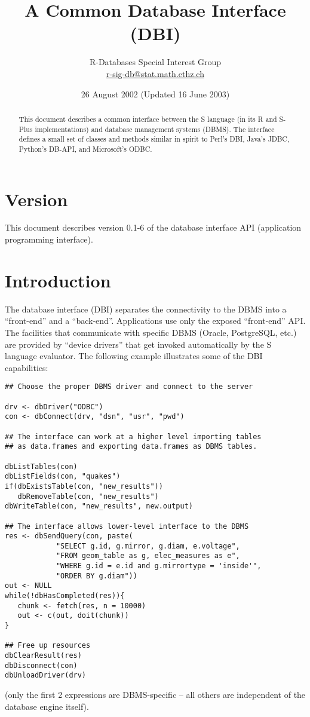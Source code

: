 \documentclass[graphics,times,psfig,dvips,hyper]{article}
\begin{document}
\title{A Common Database Interface (DBI)}
\author{
R-Databases Special Interest Group\\
\href{mailto:r-sig-db@stat.math.ethz.ch}{r-sig-db@stat.math.ethz.ch}
}

\date{26 August 2002 (Updated 16 June 2003)}

\maketitle 
\tableofcontents

\begin{abstract}
This document describes a common interface between the S language 
(in its R and S-Plus implementations) and database management systems
(DBMS).  The interface defines a small set of classes and methods
similar in spirit to Perl's DBI, Java's JDBC, Python's DB-API,
and Microsoft's ODBC.
\end{abstract}

\section{Version}\label{sec:version}
This document describes version 0.1-6 of the database interface
API (application programming interface).

\section{Introduction}\label{sec:intro}

The database interface (DBI) separates the connectivity to the DBMS
into a ``front-end'' and a ``back-end''.  Applications use only the
exposed ``front-end'' API.  The facilities that communicate with
specific DBMS (Oracle, PostgreSQL, etc.) are provided by ``device
drivers'' that get invoked automatically by the S language evaluator.
The following example illustrates some of the DBI capabilities:
\begin{verbatim}
## Choose the proper DBMS driver and connect to the server

drv <- dbDriver("ODBC")
con <- dbConnect(drv, "dsn", "usr", "pwd")

## The interface can work at a higher level importing tables 
## as data.frames and exporting data.frames as DBMS tables.

dbListTables(con)
dbListFields(con, "quakes")
if(dbExistsTable(con, "new_results"))
   dbRemoveTable(con, "new_results")
dbWriteTable(con, "new_results", new.output)

## The interface allows lower-level interface to the DBMS
res <- dbSendQuery(con, paste(
            "SELECT g.id, g.mirror, g.diam, e.voltage",
            "FROM geom_table as g, elec_measures as e",
            "WHERE g.id = e.id and g.mirrortype = 'inside'",
            "ORDER BY g.diam"))
out <- NULL
while(!dbHasCompleted(res)){
   chunk <- fetch(res, n = 10000)
   out <- c(out, doit(chunk))
}

## Free up resources
dbClearResult(res)
dbDisconnect(con)
dbUnloadDriver(drv)
\end{verbatim}
(only the first 2 expressions are DBMS-specific -- all others are
independent of the database engine itself).
\end{document}
